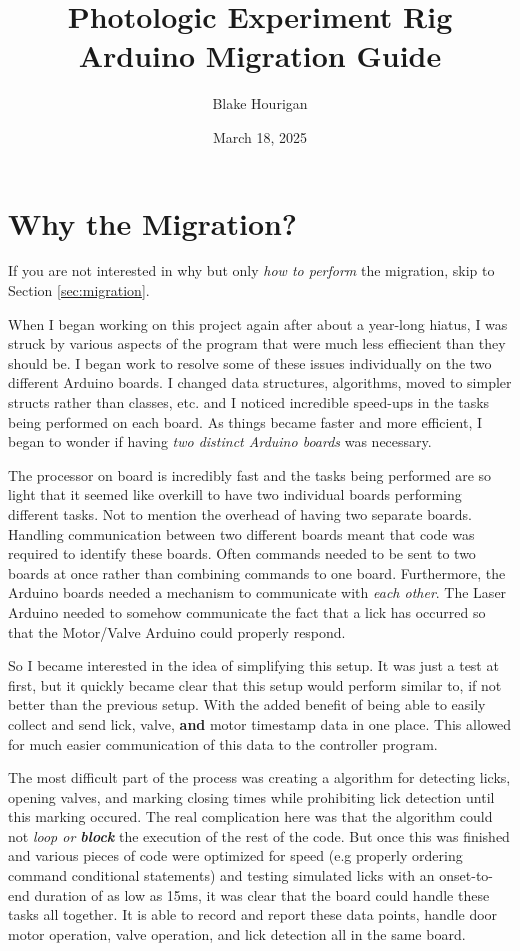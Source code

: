 \documentclass{article}
\title{\textbf{Photologic Experiment Rig}\\Arduino Migration Guide}
\author{Blake Hourigan}
\date{March 18, 2025}
\begin{document}
\maketitle
\clearpage
\tableofcontents
\clearpage


\section{Why the Migration?}
If you are not interested in why but only \textit{how to perform} the migration, skip to Section \ref{sec:migration}.

When I began working on this project again after about a year-long hiatus, I was struck by various aspects of the program that were much less effiecient than they should be. 
I began work to resolve some of these issues individually on
the two different Arduino boards. I changed data structures, algorithms, moved to simpler structs rather than classes, etc. and I noticed incredible speed-ups in the tasks being 
performed on each board. As things became faster and more efficient, I began to wonder if having \textit{two distinct Arduino boards} was necessary. 

The processor on board is incredibly fast and the tasks being performed are so light that it seemed like overkill to
have two individual boards performing different tasks. Not to mention the overhead of having two separate boards. Handling communication between two different boards meant that code
was required to identify these boards. Often commands needed to be sent to two boards at once rather than combining commands to one board. Furthermore, the Arduino boards needed 
a mechanism to communicate with \textit{each other}. The Laser Arduino needed to somehow communicate the fact that a lick has occurred so that the Motor/Valve Arduino could 
properly respond.

So I became interested in the idea of simplifying this setup. It was just a test at first, but it quickly became clear that this setup would perform similar to, if not better than the 
previous setup. With the added benefit of being able to easily collect and send lick, valve, \textbf{and} motor timestamp data in one place. This allowed for much easier communication 
of this data to the controller program. 

The most difficult part of the process was creating a algorithm for detecting licks, opening valves, and marking closing times while prohibiting 
lick detection until this marking occured. The real complication here was that the algorithm could not \textit{loop or \textbf{block}} the execution of the rest of the code. 
But once this was finished and various pieces of code were optimized
for speed (e.g properly ordering command conditional statements) and testing simulated licks with an onset-to-end duration of as low as 15ms, it was clear that the board could handle these
tasks all together. It is able to record and report these data points, handle door motor operation, valve operation, and lick detection all in the same board. 
\end{document}
